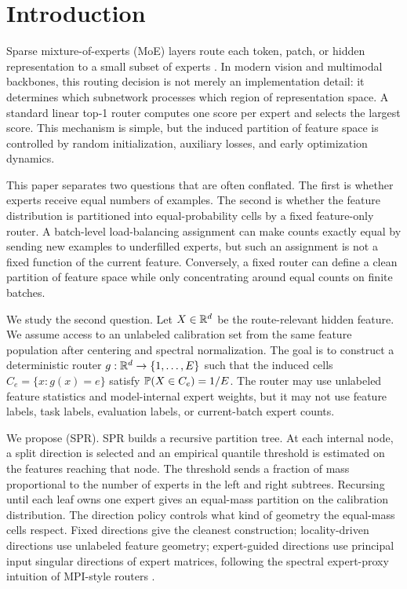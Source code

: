 \section{Introduction}

Sparse mixture-of-experts (MoE) layers route each token, patch, or hidden
representation to a small subset of experts
\cite{shazeer2017outrageously,fedus2022switch}.  In modern vision and
multimodal backbones, this routing decision is not merely an implementation
detail: it determines which subnetwork processes which region of representation
space.  A standard linear top-1 router computes one score per expert and selects
the largest score.  This mechanism is simple, but the induced partition of
feature space is controlled by random initialization, auxiliary losses, and
early optimization dynamics.

This paper separates two questions that are often conflated.  The first is
whether experts receive equal numbers of examples.  The second is whether the
feature distribution is partitioned into equal-probability cells by a fixed
feature-only router.  A batch-level load-balancing assignment can make counts
exactly equal by sending new examples to underfilled experts, but such an
assignment is not a fixed function of the current feature.  Conversely, a fixed
router can define a clean partition of feature space while only concentrating
around equal counts on finite batches.

We study the second question.  Let $X\in\mathbb{R}^d$ be the route-relevant hidden
feature.  We assume access to an unlabeled calibration set from the same feature
population after centering and spectral normalization.  The goal is to construct
a deterministic router $g:\mathbb{R}^d\to\{1,\ldots,E\}$ such that the induced cells
$C_e=\{x:g(x)=e\}$ satisfy $\mathbb{P}(X\in C_e)=1/E$.  The router may use unlabeled
feature statistics and model-internal expert weights, but it may not use feature
labels, task labels, evaluation labels, or current-batch expert counts.

We propose  (SPR).  SPR builds a recursive
partition tree.  At each internal node, a split direction is selected and an
empirical quantile threshold is estimated on the features reaching that node.
The threshold sends a fraction of mass proportional to the number of experts in
the left and right subtrees.  Recursing until each leaf owns one expert gives an
equal-mass partition on the calibration distribution.  The direction policy
controls what kind of geometry the equal-mass cells respect.  Fixed directions
give the cleanest construction; locality-driven directions use unlabeled
feature geometry; expert-guided directions use principal input singular
directions of expert matrices, following the spectral expert-proxy intuition of
MPI-style routers \cite{routermpi2026}.

